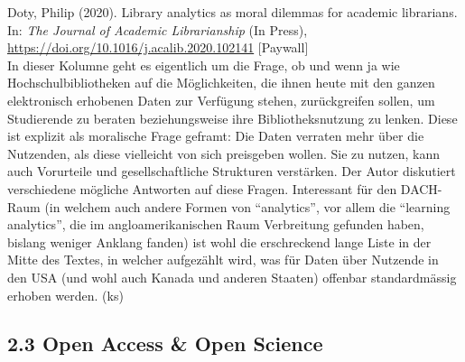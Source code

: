 \documentclass[a4paper,
fontsize=11pt,
oneside,
numbers=noperiodatend,
parskip=half-,
bibliography=totoc,
final
]{scrartcl}
\begin{document}
Doty, Philip (2020). Library analytics as moral dilemmas for academic
librarians. In: \emph{The Journal of Academic Librarianship} (In Press),
\url{https://doi.org/10.1016/j.acalib.2020.102141} {[}Paywall{]}\\
In dieser Kolumne geht es eigentlich um die Frage, ob und wenn ja wie
Hochschulbibliotheken auf die Möglichkeiten, die ihnen heute mit den
ganzen elektronisch erhobenen Daten zur Verfügung stehen, zurückgreifen
sollen, um Studierende zu beraten beziehungsweise ihre
Bibliotheksnutzung zu lenken. Diese ist explizit als moralische Frage
geframt: Die Daten verraten mehr über die Nutzenden, als diese
vielleicht von sich preisgeben wollen. Sie zu nutzen, kann auch
Vorurteile und gesellschaftliche Strukturen verstärken. Der Autor
diskutiert verschiedene mögliche Antworten auf diese Fragen. Interessant
für den DACH-Raum (in welchem auch andere Formen von ``analytics'', vor
allem die ``learning analytics'', die im angloamerikanischen Raum
Verbreitung gefunden haben, bislang weniger Anklang fanden) ist wohl die
erschreckend lange Liste in der Mitte des Textes, in welcher aufgezählt
wird, was für Daten über Nutzende in den USA (und wohl auch Kanada und
anderen Staaten) offenbar standardmässig erhoben werden. (ks)

\hypertarget{open-access-open-science}{%
\subsection{2.3 Open Access \& Open
Science}\label{open-access-open-science}}
\end{document}
